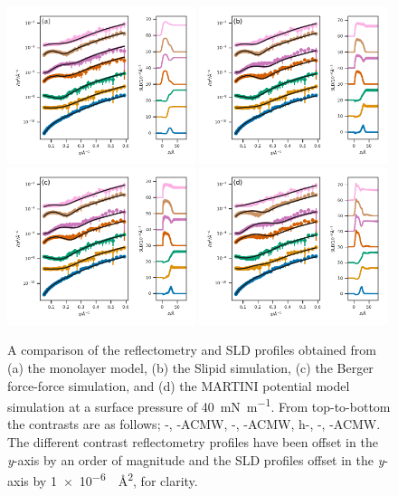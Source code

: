 \documentclass[amsmath,amssymb,superscriptaddress]{revtex4-1}
\begin{document}
%
%
\begin{figure}
 \centering
 \includegraphics[width=0.49\textwidth]{dspc_40_ref_sld}
 \includegraphics[width=0.49\textwidth]{dspc_slipids_40_ref_sld} \\
 \includegraphics[width=0.49\textwidth]{dspc_berger_40_ref_sld}
 \includegraphics[width=0.49\textwidth]{dspc_martini_40_ref_sld}
 \caption{A comparison of the reflectometry and SLD profiles obtained from (a) the monolayer model, (b) the Slipid simulation, (c) the Berger force-force simulation, and (d) the MARTINI potential model simulation at a surface pressure of \SI{40}{\milli\newton\per\meter}. From top-to-bottom the contrasts are as follows; -, -ACMW, -, -ACMW, h-, -, -ACMW. The different contrast reflectometry profiles have been offset in the \emph{y}-axis by an order of magnitude and the SLD profiles offset in the \emph{y}-axis by \SI{1e-6}{\per\square\angstrom}, for clarity.}
 \label{fig:sp40}
\end{figure}
\end{document}
